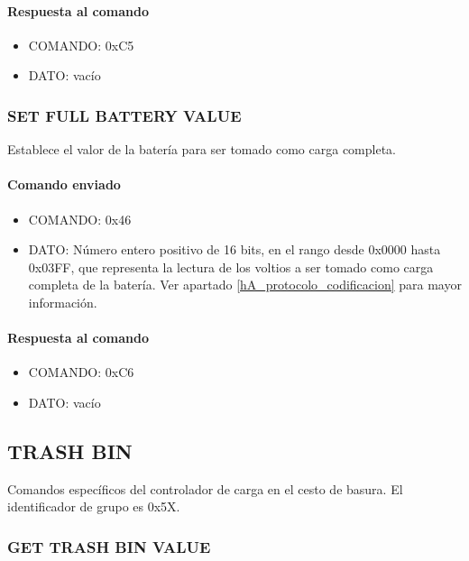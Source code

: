\paragraph*{Respuesta al comando}

\begin{itemize}
	\item{COMANDO:} 0xC5
	\item{DATO:} vac\'io
\end{itemize}

\subsubsection{SET FULL BATTERY VALUE}
\label{hA_protocolo_set_battery_empty_value}

Establece el valor de la bater\'ia para ser tomado como carga completa.

\paragraph*{Comando enviado}

\begin{itemize}
	\item{COMANDO:} 0x46
	\item{DATO:} N\'umero entero positivo de 16 bits, en el rango desde 0x0000 hasta 0x03FF,
		que representa la lectura de los voltios a ser tomado como carga completa de la bater\'ia.
		Ver apartado \ref{hA_protocolo_codificacion} para mayor informaci\'on.
\end{itemize}

\paragraph*{Respuesta al comando}

\begin{itemize}
	\item{COMANDO:} 0xC6
	\item{DATO:} vac\'io
\end{itemize}

\subsection{TRASH BIN}
\label{hA_protocolo_grupo_trash_bin}

Comandos espec\'ificos del controlador de carga en el cesto de basura.
El identificador de grupo es 0x5X.

\subsubsection{GET TRASH BIN VALUE}
\label{hA_protocolo_get_trash_bin_value}


